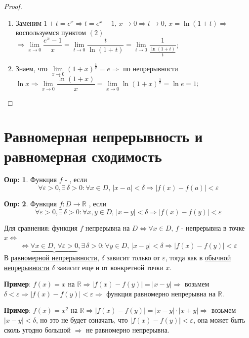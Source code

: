 \documentclass[12pt]{article}
\newcommand{\MR}{\mathbb{R}}
\newcommand{\VE}{\varepsilon}
\theoremstyle{definition}
\newtheorem{defn}{Опр:}
\begin{document}
\begin{proof}\hfill
	\begin{enumerate}[label={(\arabic*)}]
		\item Заменим $1+t =e^x \Rightarrow t = e^x - 1, \, x\to 0 \Rightarrow t \to 0, \, x = \ln(1+t) \Rightarrow$ воспользуемся пунктом $(2)$\\  
		$\Rightarrow \lim\limits_{x \to 0}\dfrac{e^x-1}{x}=\lim\limits_{t \to 0}\dfrac{t}{\ln(1+t)} = \lim\limits_{t \to 0}\dfrac{1}{\frac{\ln(1+t)}{t}} $;
		\item Знаем, что $\lim\limits_{x \to 0}(1+x)^{\frac{1}{x}} = e \Rightarrow$ по непрерывности $\ln{x} \Rightarrow \lim\limits_{x \to 0}\dfrac{\ln(1+x)}{x} = \lim\limits_{x \to 0}\ln(1+x)^{\frac{1}{x}} = \ln{e} =1$;
	\end{enumerate}
\end{proof}


\section*{Равномерная непрерывность и равномерная сходимость}

\begin{defn}
	Функция $f$ - , если 
	$$\forall \varepsilon > 0, \exists \, \delta > 0 \colon \forall x \in D, \, |x-a| < \delta \Rightarrow |f(x) - f(a)| < \varepsilon$$
\end{defn}

\begin{defn}
	Функция $f\colon D \to \MR$ ,  если 
	$$\forall \VE >0, \exists \, \delta >0 \colon \forall x,y \in D, \, |x-y| < \delta \Rightarrow |f(x)-f(y)| < \VE$$
\end{defn}

Для сравнения: функция $f$ непрерывна на $D \Leftrightarrow \forall x \in D, \, f$ - непрерывна в точке $x \Leftrightarrow$ 
$$\Leftrightarrow \underbrace{\forall x \in D, \, \forall \VE >0}, \exists \, \delta >0 \colon \forall y \in D, \, |x-y| < \delta \Rightarrow |f(x)-f(y)| < \VE$$
В \uline{равномерной непрерывности}, $\delta$ зависит только от $\VE$, тогда как в \uline{обычной непрерывности} $\delta$ зависит еще и от конкретной точки $x$.

\textbf{Пример}: $f(x) = x$ на $\MR \Rightarrow |f(x) - f(y)| = |x - y| \Rightarrow$ возьмем $\delta < \VE \Rightarrow |f(x) - f(y)| < \VE \Rightarrow$ функция равномерно непрерывна на $\MR$.

\textbf{Пример}: $f(x) = x^2$ на $\MR \Rightarrow |f(x) - f(y)| = |x - y|{\cdot}|x+y| \Rightarrow$ возьмем $|x-y| < \delta$, но это не будет означать, что $|f(x) - f(y)| < \VE$, она может быть сколь угодно большой $\Rightarrow$ не равномерно непрерывна.
\end{document}
